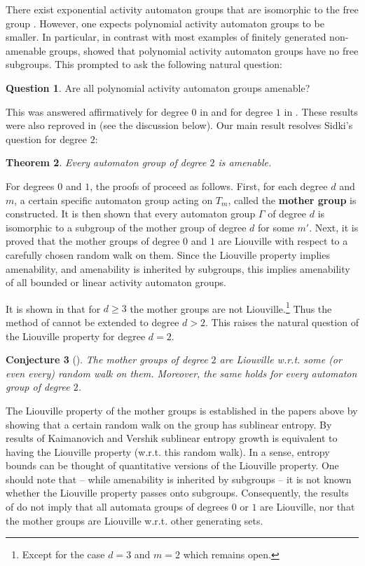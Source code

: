 \documentclass[12pt]{article}
\newtheorem{thm}{Theorem}[section]
\newtheorem{conj}[thm]{Conjecture}
\theoremstyle{definition}
\newtheorem{question}[thm]{Question}
\numberwithin{equation}{section}
\begin{document}
There exist exponential activity automaton groups that are isomorphic to the free group \cite{GlasnerMozes05,Vorobets07}.
However, one expects polynomial activity automaton groups to be smaller.
In particular, in contrast with most examples of finitely generated non-amenable groups, \cite{Sidki00} showed that polynomial activity automaton groups have no free subgroups.
This prompted \cite{Sidki04} to ask the following natural question:

\begin{question}
  Are all polynomial activity automaton groups amenable?
\end{question}

This was answered affirmatively for degree $0$ in \cite{BKN} and for degree $1$ in \cite{AAV}.
These results were also reproved in \cite{JNS} (see the discussion below).
Our main result resolves Sidki's question for degree $2$:

\begin{thm}\label{T:main}
  Every automaton group of degree $2$ is amenable.
\end{thm}

For degrees $0$ and $1$, the proofs of \cite{BKN,AAV} proceed as follows.
First, for each degree $d$ and $m$, a certain specific automaton group acting on $T_m$, called the \textbf{mother group} is constructed.
It is then shown that every automaton group $\Gamma$ of degree $d$ is isomorphic to a subgroup of the mother group of degree $d$ for some $m'$.
Next, it is proved that the mother groups of degree $0$ and $1$ are Liouville with respect to a carefully chosen random walk on them.
Since the Liouville property implies amenability, and amenability is inherited by subgroups, this implies amenability of all bounded or linear activity automaton groups.

It is shown in \cite{AV} that for $d\ge 3$ the mother groups are not Liouville.\footnote{Except for the case $d=3$ and $m=2$ which remains open.}
Thus the method of \cite{BKN} cannot be extended to degree $d>2$.
This raises the natural question of the Liouville property for degree $d=2$.

\begin{conj}[\cite{AAV}]
  The mother groups of degree $2$ are Liouville w.r.t. some (or even every) random walk on them.
  Moreover, the same holds for every automaton group of degree $2$.
\end{conj}

The Liouville property of the mother groups is established in the papers above by showing that a certain random walk on the group has sublinear entropy.
By results of Kaimanovich and Vershik \cite{KV} sublinear entropy growth is equivalent to having the Liouville property (w.r.t. this random walk).
In a sense, entropy bounds can be thought of quantitative versions of the Liouville property.
One should note that -- while amenability is inherited by subgroups -- it is not known whether the Liouville property passes onto subgroups.
Consequently, the results of \cite{BKN,AAV} do not imply that all automata groups of degrees $0$ or $1$ are Liouville, nor that the mother groups are Liouville w.r.t. other generating sets.
\end{document}
